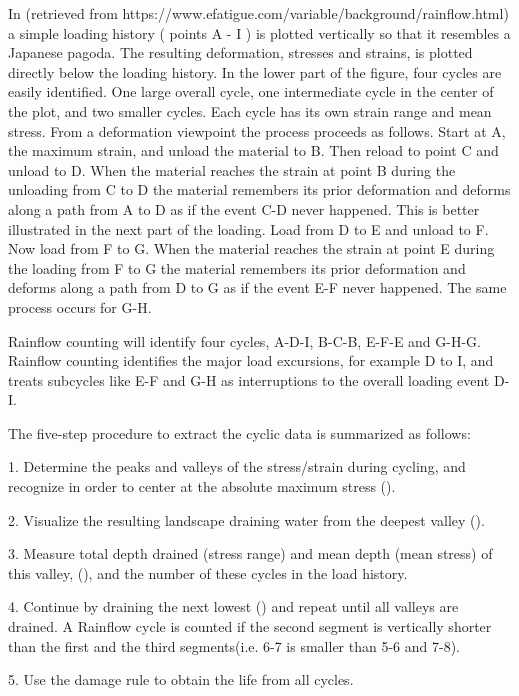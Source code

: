 In  (retrieved from https://www.efatigue.com/variable/background/rainflow.html) a simple loading history ( points A - I ) is plotted vertically so that it resembles a Japanese pagoda. The resulting deformation, stresses and strains, is plotted directly below the loading history. In the lower part of the figure, four cycles are easily identified. One large overall cycle, one intermediate cycle in the center of the plot, and two smaller cycles. Each cycle has its own strain range and mean stress. From a deformation viewpoint the process proceeds as follows. Start at A, the maximum strain, and unload the material to B. Then reload to point C and unload to D. When the material reaches the strain at point B during the unloading from C to D the material remembers its prior deformation and deforms along a path from A to D as if the event C-D never happened. This is better illustrated in the next part of the loading. Load from D to E and unload to F. Now load from F to G. When the material reaches the strain at point E during the loading from F to G the material remembers its prior deformation and deforms along a path from D to G as if the event E-F never happened. The same process occurs for G-H.

Rainflow counting will identify four cycles, A-D-I, B-C-B, E-F-E and G-H-G. Rainflow counting identifies the major load excursions, for example D to I, and treats subcycles like E-F and G-H as interruptions to the overall loading event D-I.

\vspace{6pt}
The five-step procedure to extract the cyclic data is summarized as follows:

1.  Determine the peaks and valleys of the stress/strain during cycling, and recognize in order to center at the absolute maximum stress ().

2.  Visualize the resulting landscape draining water from the deepest valley ().

3.  Measure total depth drained (stress range) and mean depth (mean stress) of this valley, (), and the number of these cycles in the load history. 

4.  Continue by draining the next lowest () and repeat until all valleys are drained. A  Rainflow  cycle is counted if the second segment is vertically shorter than the first and the third segments(i.e. 6-7 is smaller than 5-6 and 7-8).

5.  Use the damage rule to obtain the life from all cycles.

